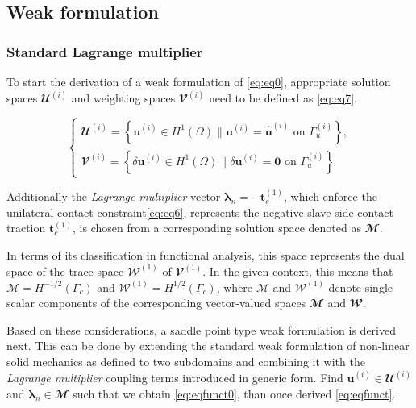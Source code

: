 \documentclass[a4paper,10pt]{article} %
\begin{document}
\subsection{Weak formulation}

\subsubsection{Standard Lagrange multiplier}

To start the derivation of a weak formulation of \eqref{eq:eq0}, appropriate solution spaces $\mathbfcal{U}^{(i)}$ and
weighting spaces $\mathbfcal{V}^{(i)}$ need to be defined as \eqref{eq:eq7}.

\begin{equation}\label{eq:eq7}
 \begin{cases}
  \mathbfcal{U}^{(i)} = \left\{ \mathbf{u}^{(i)} \in H^1(\Omega) \| \mathbf{u}^{(i)} = \hat{\mathbf{u}}^{(i)} \text{ on } \Gamma_u^{(i)}\right\},\\
  \mathbfcal{V}^{(i)} = \left\{ \delta\mathbf{u}^{(i)} \in H^1(\Omega) \| \delta\mathbf{u}^{(i)} = \mathbf{0} \text{ on } \Gamma_u^{(i)}\right\}
 \end{cases}
\end{equation}

Additionally the \textit{Lagrange multiplier} vector $\boldsymbol{\lambda}_n = -\mathbf{t}_c^{(1)}$, which enforce the unilateral contact constraint\eqref{eq:eq6}, represents the negative slave side contact traction $\mathbf{t}_c^{(1)}$, is chosen from a corresponding solution space denoted as $\mathbfcal{M}$.%


In terms of its classification in functional analysis, this space represents the dual space of the trace space $\mathbfcal{W}^{(1)}$ of $\mathbfcal{V}^{(1)}$. In the given context, this means that $\mathcal{M} = H^{−1/2} (\Gamma_c)$ and $\mathcal{W}^{(1)} = H^{1/2} (\Gamma_c)$, where $\mathcal{M}$  and $\mathcal{W}^{(1)}$ denote single scalar components of the corresponding vector-valued spaces $\mathbfcal{M}$ and $\mathbfcal{W}$.

Based on these considerations, a saddle point type weak formulation is derived next. This can be done by extending the standard weak formulation of non-linear solid mechanics as defined to two subdomains and combining it with the \textit{Lagrange multiplier} coupling terms introduced in generic form. Find $\mathbf{u}^{(i)} \in \mathbfcal{U}^{(i)}$ and $\boldsymbol{\lambda}_n \in \mathbfcal{M}$ such that we obtain \eqref{eq:eqfunct0}, than once derived \eqref{eq:eqfunct}.
\end{document}
